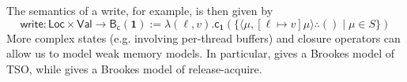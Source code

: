 \documentclass[acmsmall,screen,review]{acmart}
\newcommand{\mb}[1]{\ensuremath{\mathbf{#1}}}
\newcommand{\ms}[1]{\ensuremath{\mathsf{#1}}}
\newcommand{\tret}[2]{#1 \therefore #2}
\begin{document}
The semantics of a write, for example, is then given by
\begin{equation*}
  \ms{write} : \ms{Loc} \times \ms{Val} \to \ms{B}_{\ms{c}}(\mb{1})
  := \lambda (\ell, v) . 
    \ms{c}_{\mb{1}}(\{\tret{\langle \mu, [\ell \mapsto v]\mu \rangle}{()} \mid \mu \in S\})
\end{equation*}
More complex states (e.g. involving per-thread buffers) and closure operators can allow us to model
weak memory models. In particular, \citet{jagadeesan-brookes-relaxed-12} gives a Brookes model of
TSO, while \citet{release-acquire} gives a Brookes model of release-acquire.
\end{document}
